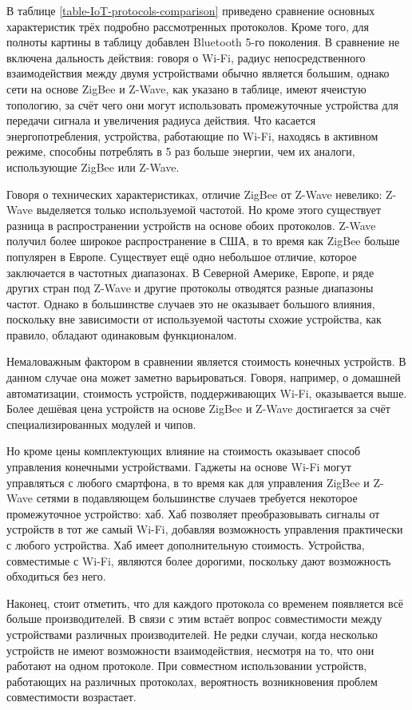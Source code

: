 	В таблице \ref{table-IoT-protocols-comparison} приведено сравнение основных характеристик трёх подробно 
	рассмотренных протоколов. Кроме того, для полноты картины в таблицу добавлен Bluetooth 5-го поколения.
	В сравнение не включена дальность действия: говоря о Wi-Fi, радиус непосредственного
	взаимодействия между двумя устройствами обычно является большим, однако сети на основе
	ZigBee и Z-Wave, как указано в таблице, имеют ячеистую топологию, за счёт чего они могут использовать
	промежуточные устройства для передачи сигнала и увеличения радиуса действия. Что касается 
	энергопотребления, устройства, работающие по Wi-Fi, находясь в активном режиме, способны потреблять
	в 5 раз больше энергии, чем их аналоги, использующие ZigBee или Z-Wave.
	
	Говоря о технических характеристиках, отличие ZigBee от Z-Wave невелико: Z-Wave выделяется только
	используемой частотой. Но кроме этого существует разница в распространении устройств на основе
	обоих протоколов. Z-Wave получил более широкое распространение в США, в то время как ZigBee больше
	популярен в Европе. Существует ещё одно небольшое отличие, которое заключается в частотных диапазонах. 
	В Северной Америке, 
	Европе, и ряде других стран под Z-Wave и другие протоколы отводятся разные диапазоны частот. Однако
	в большинстве случаев это не оказывает большого влияния, поскольку вне зависимости от используемой 
	частоты схожие устройства, как правило, обладают одинаковым функционалом.
	
	Немаловажным фактором в сравнении является стоимость конечных устройств. В данном случае она может
	заметно варьироваться. Говоря, например, о домашней автоматизации, стоимость устройств, поддерживающих
	Wi-Fi, оказывается выше. Более дешёвая цена устройств на основе ZigBee и Z-Wave достигается
	за счёт специализированных модулей и чипов.
	
	Но кроме цены комплектующих влияние на стоимость оказывает способ управления конечными устройствами.
	Гаджеты на основе Wi-Fi могут управляться с любого смартфона, в то время как для управления ZigBee и Z-Wave
	сетями в подавляющем большинстве случаев требуется некоторое промежуточное устройство: хаб. Хаб
	позволяет преобразовывать сигналы от устройств в тот же самый Wi-Fi, добавляя возможность управления
	практически с любого устройства. Хаб имеет дополнительную стоимость. Устройства, совместимые с  Wi-Fi,
	являются более дорогими, поскольку дают возможность обходиться без него.
	
	Наконец, стоит отметить, что для каждого протокола со временем появляется всё больше производителей.
	В связи с этим встаёт вопрос совместимости между устройствами различных производителей. Не редки случаи,
	когда несколько устройств не имеют возможности взаимодействия, несмотря на то, что они работают
	на одном протоколе. При совместном использовании устройств, работающих на различных протоколах,
	вероятность возникновения проблем совместимости возрастает.
	
